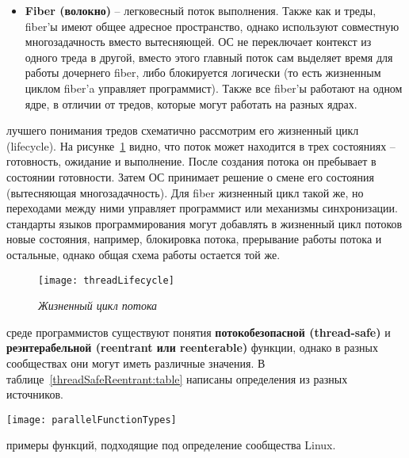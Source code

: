 {\begin{itemize}
			\item\textbf{Fiber (волокно)} -- легковесный поток выполнения. Также как и треды, fiber'ы имеют общее адресное пространство, однако используют совместную многозадачность вместо вытесняющей. ОС не переключает контекст из одного треда в другой, вместо этого главный поток сам выделяет время для работы дочернего fiber, либо блокируется логически (то есть жизненным циклом fiber'a управляет программист). Также все fiber'ы работают на одном ядре, в отличии от тредов, которые могут работать на разных ядрах.
		\end{itemize}
	 лучшего понимания тредов схематично рассмотрим его жизненный цикл (lifecycle). На рисунке~\ref{threadLifecycle:image} видно, что поток может находится в трех состояниях -- готовность, ожидание и выполнение. После создания потока он пребывает в состоянии готовности. Затем ОС принимает решение о смене его состояния (вытесняющая многозадачность). Для fiber жизненный цикл такой же, но переходами между ними управляет программист или механизмы синхронизации.
	 стандарты языков программирования могут добавлять в жизненный цикл потоков новые состояния, например, блокировка потока, прерывание работы потока и остальные, однако общая схема работы остается той же.
		\begin{figure}[H]
			\texttt{[image: threadLifecycle]}
			\caption{\textit{Жизненный цикл потока}}
			\label{threadLifecycle:image}
		\end{figure}
	 среде программистов существуют понятия \textbf{потокобезопасной (thread-safe)} и \textbf{реэнтерабельной (reentrant или reenterable)} функции, однако в разных сообществах они могут иметь различные значения. В таблице~\ref{threadSafeReentrant:table} написаны определения из разных источников.
	\begin{table}[H]
		\caption{Определения thread-safe и reentrant функций}
		\label{threadSafeReentrant:table}
		\begin{center}
					\texttt{[image: parallelFunctionTypes]}
		\end{center}
	\end{table}
	 примеры функций, подходящие под определение сообщества Linux.
	\begin{figure}[H]
		

\end{figure}}
